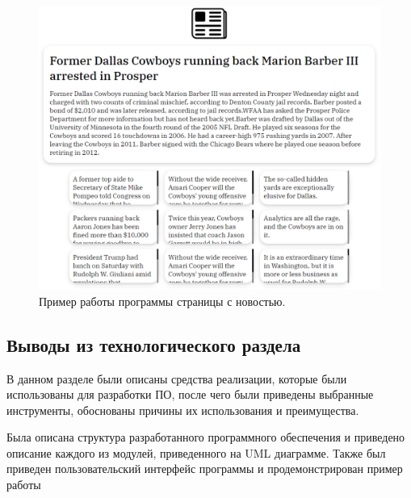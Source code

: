 \begin{figure}[H]
	\centering
	\includegraphics[width=\textwidth]{img/prog_2.pdf}
	\caption{Пример работы программы страницы с новостью.}
	\label{prog_2}
\end{figure}  

\subsection{Выводы из технологического раздела}

В данном разделе были описаны средства реализации, которые были использованы для разработки ПО, после чего были приведены выбранные инструменты, обоснованы причины их использования и преимущества.

Была описана структура разработанного программного обеспечения и приведено описание каждого из модулей, приведенного на UML диаграмме. Также был приведен пользовательский интерфейс программы и продемонстрирован пример работы

\pagebreak